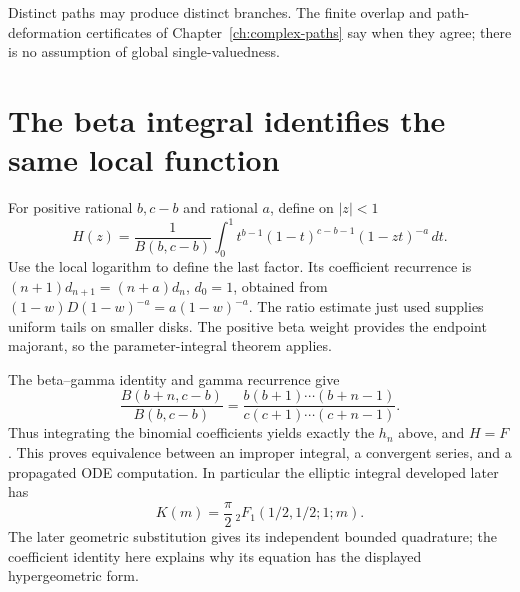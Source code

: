 Distinct paths may produce distinct branches.  The finite overlap and
path-deformation certificates of Chapter~\ref{ch:complex-paths} say when
they agree; there is no assumption of global single-valuedness.

\section{The beta integral identifies the same local function}
For positive rational $b,c-b$ and rational $a$, define on $|z|<1$
\[
 H(z)=\frac1{B(b,c-b)}\int_0^1
       t^{b-1}(1-t)^{c-b-1}(1-zt)^{-a}\,dt.
\]
Use the local logarithm to define the last factor.  Its coefficient
recurrence is $(n+1)d_{n+1}=(n+a)d_n$, $d_0=1$, obtained from
$(1-w)D(1-w)^{-a}=a(1-w)^{-a}$.  The ratio estimate just used supplies
uniform tails on smaller disks.  The positive beta weight provides the
endpoint majorant, so the parameter-integral theorem applies.

The beta--gamma identity and gamma recurrence give
\[
 \frac{B(b+n,c-b)}{B(b,c-b)}
       =\frac{b(b+1)\cdots(b+n-1)}{c(c+1)\cdots(c+n-1)}.
\]
Thus integrating the binomial coefficients yields exactly the $h_n$
above, and $H=F$.  This proves equivalence between an improper integral,
a convergent series, and a propagated ODE computation.
In particular the elliptic integral developed later has
\[
 K(m)=\frac\pi2\,{}_2F_1(1/2,1/2;1;m).
\]
The later geometric substitution gives its independent bounded quadrature;
the coefficient identity here explains why its equation has the displayed
hypergeometric form.
